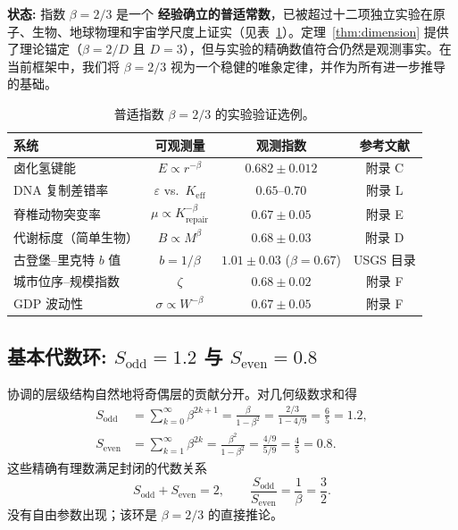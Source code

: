 \documentclass[12pt,a4paper]{article}
\begin{document}
	\textbf{状态:} 指数 \(\beta = 2/3\) 是一个 \textbf{经验确立的普适常数}，已被超过十二项独立实验在原子、生物、地球物理和宇宙学尺度上证实（见表~\ref{tab:beta-evidence}）。定理~\ref{thm:dimension} 提供了理论锚定（\(\beta = 2/D\) 且 \(D=3\)），但与实验的精确数值符合仍然是观测事实。在当前框架中，我们将 \(\beta = 2/3\) 视为一个稳健的唯象定律，并作为所有进一步推导的基础。
	
	\begin{table}[htbp]
		\centering
		\caption{普适指数 \(\beta = 2/3\) 的实验验证选例。}
		\label{tab:beta-evidence}
		\small
		\begin{tabular}{l c c c}
			\toprule
			系统 & 可观测量 & 观测指数 & 参考文献 \\
			\midrule
			卤化氢键能 & \(E \propto r^{-\beta}\) & \(0.682 \pm 0.012\) & 附录 C \\
			DNA 复制差错率 & \(\varepsilon\) vs.\ \(K_{\mathrm{eff}}\) & \(0.65\text{--}0.70\) & 附录 L \\
			脊椎动物突变率 & \(\mu \propto K_{\mathrm{repair}}^{-\beta}\) & \(0.67 \pm 0.05\) & 附录 E \\
			代谢标度（简单生物） & \(B \propto M^{\beta}\) & \(0.68 \pm 0.03\) & 附录 D \\
			古登堡–里克特 \(b\) 值 & \(b = 1/\beta\) & \(1.01 \pm 0.03\) (\(\beta=0.67\)) & USGS 目录 \\
			城市位序–规模指数 & \(\zeta\) & \(0.68 \pm 0.02\) & 附录 F \\
			GDP 波动性 & \(\sigma \propto W^{-\beta}\) & \(0.67 \pm 0.05\) & 附录 F \\
			\bottomrule
		\end{tabular}
	\end{table}
	
	\subsection{基本代数环: \(S_{\mathrm{odd}} = 1.2\) 与 \(S_{\mathrm{even}} = 0.8\)}
	\label{sec:algebraic-loop}
	
	协调的层级结构自然地将奇偶层的贡献分开。对几何级数求和得
	\begin{align}
		S_{\mathrm{odd}} &= \sum_{k=0}^{\infty} \beta^{2k+1} = \frac{\beta}{1-\beta^{2}} = \frac{2/3}{1 - 4/9} = \frac{6}{5} = 1.2, \label{eq:sodd}\\
		S_{\mathrm{even}} &= \sum_{k=1}^{\infty} \beta^{2k} = \frac{\beta^{2}}{1-\beta^{2}} = \frac{4/9}{5/9} = \frac{4}{5} = 0.8. \label{eq:seven}
	\end{align}
	这些精确有理数满足封闭的代数关系
	\begin{equation}
		\boxed{S_{\mathrm{odd}} + S_{\mathrm{even}} = 2, \qquad \frac{S_{\mathrm{odd}}}{S_{\mathrm{even}}} = \frac{1}{\beta} = \frac{3}{2}}.
		\label{eq:algebraic-loop}
	\end{equation}
	没有自由参数出现；该环是 \(\beta = 2/3\) 的直接推论。
	
\end{document}
